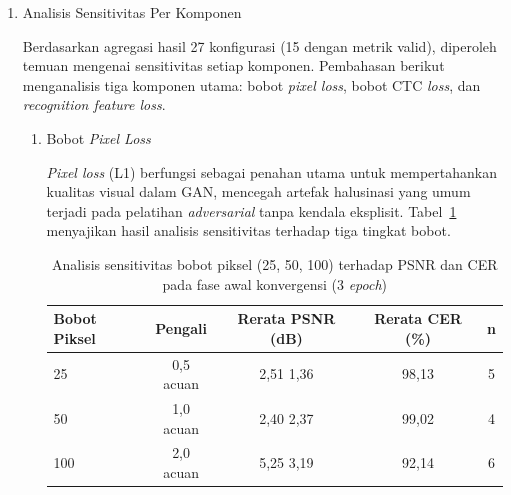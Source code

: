 \documentclass[12pt,a4paper]{article}
\begin{document}
\begin{enumerate}[leftmargin=1.5em, labelsep=0.5em, itemindent=0pt, label=\arabic*., topsep=0pt, partopsep=0pt]
    Catatan: Hasil PSNR dari \textit{grid search} (rentang 0,58--11,39 dB) tidak dapat dibandingkan langsung dengan pelatihan produksi (30,91 dB) karena perbedaan durasi pelatihan (3 berbanding 50 \textit{epoch}). Fokus analisis adalah pada tren relatif dan sensitivitas komponen.

    \item Analisis Sensitivitas Per Komponen
    
    Berdasarkan agregasi hasil 27 konfigurasi (15 dengan metrik valid), diperoleh temuan mengenai sensitivitas setiap komponen. Pembahasan berikut menganalisis tiga komponen utama: bobot \textit{pixel loss}, bobot CTC \textit{loss}, dan \textit{recognition feature loss}.

    \begin{enumerate}[leftmargin=1.5em, labelsep=0.5em, itemindent=0pt, topsep=0.5em, label=\alph*.]
        \item Bobot \textit{Pixel Loss}
        
        \textit{Pixel loss} (L1) berfungsi sebagai penahan utama untuk mempertahankan kualitas visual dalam GAN, mencegah artefak halusinasi yang umum terjadi pada pelatihan \textit{adversarial} tanpa kendala eksplisit. Tabel~\ref{tab:pixel-sensitivity} menyajikan hasil analisis sensitivitas terhadap tiga tingkat bobot.

        \begin{table}[!htbp]
            \caption[Sensitivitas bobot piksel]{Analisis sensitivitas bobot piksel (25, 50, 100) terhadap PSNR dan CER pada fase awal konvergensi (3 \textit{epoch})}
            \label{tab:pixel-sensitivity}
            \normalsize
            \begin{tabular}{lcccc}
                \hline
                \textbf{Bobot Piksel} & \textbf{Pengali}           & \textbf{Rerata PSNR (dB)}   & \textbf{Rerata CER (\%)} & \textbf{n} \\
                \hline
                25           & 0,5\texttimes{} acuan & 2,51 \textpm{} 1,36 & 98,13        & 5 \\
                50           & 1,0\texttimes{} acuan & 2,40 \textpm{} 2,37 & 99,02        & 4 \\
                100          & 2,0\texttimes{} acuan & 5,25 \textpm{} 3,19 & 92,14        & 6 \\
                \hline
            \end{tabular}
        \end{table}


\end{enumerate}
\end{enumerate}
\end{document}

